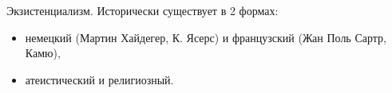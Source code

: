 Экзистенциализм.
Исторически существует в 2 формах:
\begin{itemize}
	\item немецкий (Мартин Хайдегер, К. Ясерс) и французский (Жан Поль Сартр, Камю),
	\item атеистический и религиозный.
\end{itemize}
